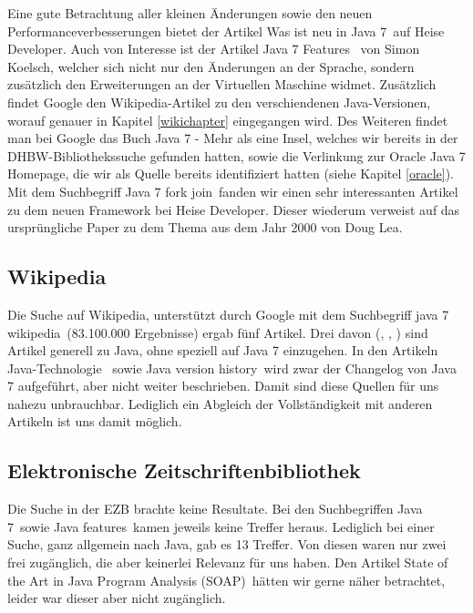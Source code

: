 Eine gute Betrachtung aller kleinen Änderungen sowie den neuen Performanceverbesserungen bietet der Artikel
\glqq Was ist neu in Java 7\grqq\cite{heiseWasistNeu}~auf Heise Developer.
Auch von Interesse ist der Artikel \glqq Java 7 Features\grqq\cite{blogJava7Features} ~von Simon Koelsch, welcher sich nicht nur
den Änderungen an der Sprache, sondern zusätzlich den Erweiterungen an der Virtuellen Maschine widmet.
Zusätzlich findet Google den Wikipedia-Artikel zu den verschiendenen Java-Versionen, worauf genauer in Kapitel \ref{wikichapter} eingegangen wird.
Des Weiteren findet man bei Google das Buch \glqq Java 7 - Mehr als eine Insel\grqq\cite{javainsel2}, welches wir bereits in der
DHBW-Bibliothekssuche gefunden hatten, sowie die Verlinkung zur Oracle Java 7 Homepage, die wir als  Quelle bereits
identifiziert hatten (siehe Kapitel \ref{oracle}).\\

Mit dem Suchbegriff \glqq Java 7 fork join\grqq ~fanden wir einen sehr interessanten Artikel zu dem neuen Framework bei Heise Developer\cite{forkjoinheise}. Dieser wiederum verweist auf das ursprüngliche Paper zu dem Thema aus dem Jahr 2000 von Doug Lea\cite{forkjoinpaper}.

\subsection*{Wikipedia}\label{wikichapter}
Die Suche auf Wikipedia, unterstützt durch Google mit dem Suchbegriff \glqq java 7 wikipedia\grqq ~(83.100.000 Ergebnisse) ergab
fünf Artikel. Drei davon (\cite{wikiJavaSoftwarePlatform}, \cite{wikiJavaProgrammiersprache}, \cite{wikiJavaStandardEdition})
sind Artikel generell zu Java, ohne speziell auf Java 7 einzugehen. In den Artikeln \glqq Java-Technologie\grqq\cite{wikiJavaTechnologie}
~sowie \glqq Java version history\grqq\cite{wikiJavaVersionHistory}~wird zwar der Changelog von Java 7 aufgeführt, aber nicht
weiter beschrieben. Damit sind diese Quellen für uns nahezu unbrauchbar. Lediglich ein Abgleich der Vollständigkeit mit anderen
Artikeln ist uns damit möglich.

\subsection*{Elektronische Zeitschriftenbibliothek}
Die Suche in der EZB brachte keine Resultate. Bei den Suchbegriffen \glqq Java 7\grqq~sowie \glqq Java features\grqq~kamen
jeweils keine Treffer heraus. Lediglich bei einer Suche, ganz allgemein nach \glqq Java\grqq , gab es 13 Treffer. Von diesen waren
nur zwei frei zugänglich, die aber keinerlei Relevanz für uns haben. Den Artikel \glqq State of the Art in Java Program Analysis
(SOAP)\grqq ~hätten wir gerne näher betrachtet, leider war dieser aber nicht zugänglich.

